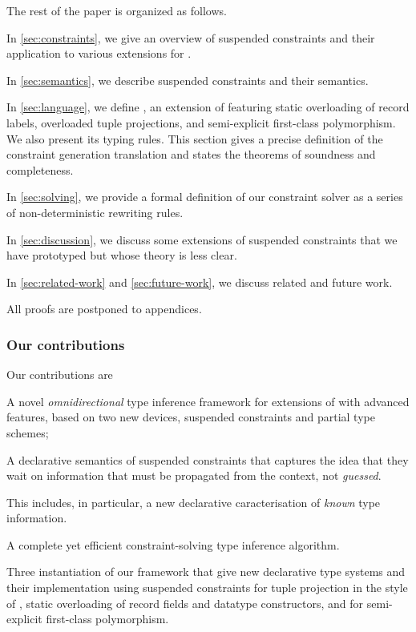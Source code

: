 \documentclass[acmsmall,screen,nonacm,review]{acmart}
\begin{document}
The rest of the paper is organized as follows.
\begin{enumerate*}[label={}]
\item
  In \cref{sec:constraints}, we give an overview of suspended constraints
  and their application to various extensions for \ML.
\item
  In \cref{sec:semantics}, we describe suspended constraints and their semantics.
\item
  In \cref{sec:language}, we define \OML, an extension of \ML featuring static
  overloading of record labels, overloaded tuple projections, and
  semi-explicit first-class polymorphism. We also present its typing rules.
  This section gives a precise definition of the constraint generation
  translation and states the theorems of soundness and completeness.
\item
  In \cref{sec:solving}, we provide a formal definition of our constraint
  solver as a series of non-deterministic rewriting rules.
\item In \cref{sec:discussion}, we discuss some extensions of suspended
  constraints that we have prototyped but whose theory is less clear.
\item
  In \cref{sec:related-work} and \cref{sec:future-work}, we discuss related
  and future work.
\end{enumerate*}
All proofs are postponed to appendices.

\subsubsection* {Our contributions}

Our contributions are
\begin{enumerate*}
\item
  A novel \emph{omnidirectional} type inference framework for
  extensions of \ML with advanced features, based on two new devices,
  suspended constraints and partial type schemes;

\item A declarative semantics of suspended constraints that captures the
  idea that they wait on information that must be propagated from the
  context, not \emph{guessed}.

  This includes, in particular, a new declarative caracterisation of
  \emph{known} type information.

\item
  A complete yet efficient constraint-solving type inference algorithm.

\item
  Three instantiation of our framework that give new declarative type
  systems and their implementation using suspended constraints for tuple
  projection in the style of \SML, static overloading of record fields and
  datatype constructors, and for semi-explicit first-class polymorphism.

\end{enumerate*}
\end{document}
